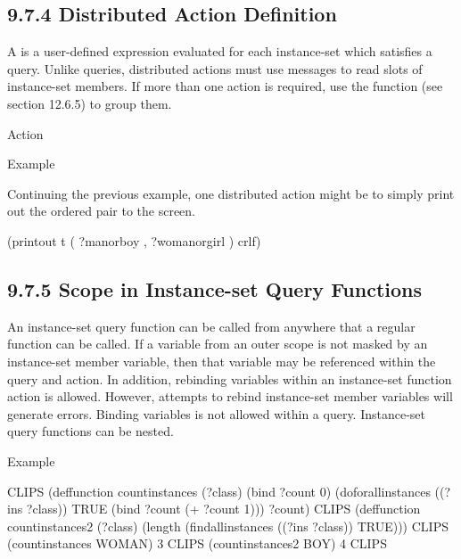 \documentclass[letterpaper,10pt,english]{sphinxmanual}
\begin{document}
\subsection{9.7.4 Distributed Action Definition}
\label{\detokenize{cool:distributed-action-definition}}
A  is a user-defined expression evaluated for each
instance-set which satisfies a query. Unlike queries, distributed
actions must use messages to read slots of instance-set members. If more
than one action is required, use the  function (see section
12.6.5) to group them.

Action 

\begin{sphinxVerbatim}[commandchars=\\\{\}]
  
\end{sphinxVerbatim}

Example

Continuing the previous example, one distributed action might be to
simply print out the ordered pair to the screen.

\begin{sphinxVerbatim}[commandchars=\\\{\}]
(printout t \PYGZdq{}(\PYGZdq{} ?man\PYGZhy{}or\PYGZhy{}boy \PYGZdq{},\PYGZdq{} ?woman\PYGZhy{}or\PYGZhy{}girl \PYGZdq{})\PYGZdq{} crlf)
\end{sphinxVerbatim}


\subsection{9.7.5 Scope in Instance-set Query Functions}
\label{\detokenize{cool:scope-in-instance-set-query-functions}}
An instance-set query function can be called from anywhere that a
regular function can be called. If a variable from an outer scope is not
masked by an instance-set member variable, then that variable may be
referenced within the query and action. In addition, rebinding variables
within an instance-set function action is allowed. However, attempts to
rebind instance-set member variables will generate errors. Binding
variables is not allowed within a query. Instance-set query functions
can be nested.

Example

\begin{sphinxVerbatim}[commandchars=\\\{\}]
CLIPS\PYGZgt{}
(deffunction count\PYGZhy{}instances (?class)
  (bind ?count 0)
  (do\PYGZhy{}for\PYGZhy{}all\PYGZhy{}instances ((?ins ?class)) TRUE
  (bind ?count (+ ?count 1)))
  ?count)
CLIPS\PYGZgt{}
(deffunction count\PYGZhy{}instances\PYGZhy{}2 (?class)
  (length (find\PYGZhy{}all\PYGZhy{}instances ((?ins ?class)) TRUE)))
CLIPS\PYGZgt{} (count\PYGZhy{}instances WOMAN)
3
CLIPS\PYGZgt{} (count\PYGZhy{}instances\PYGZhy{}2 BOY)
4
CLIPS\PYGZgt{}
\end{sphinxVerbatim}
\end{document}
